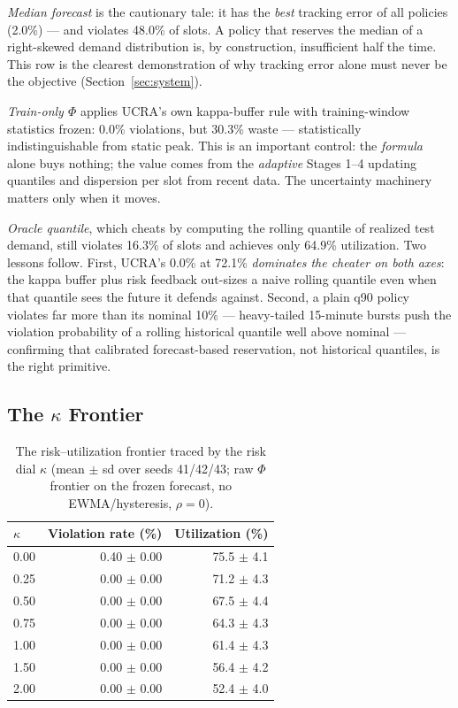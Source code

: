 \emph{Median forecast} is the cautionary tale: it has the \emph{best}
tracking error of all policies (2.0\%) --- and violates 48.0\% of
slots. A policy that reserves the median of a right-skewed demand
distribution is, by construction, insufficient half the time. This
row is the clearest demonstration of why tracking error alone must
never be the objective (Section~\ref{sec:system}).

\emph{Train-only $\Phi$} applies UCRA's own kappa-buffer rule with
training-window statistics frozen: 0.0\% violations, but 30.3\% waste
--- statistically indistinguishable from static peak. This is an
important control: the \emph{formula} alone buys nothing; the value
comes from the \emph{adaptive} Stages 1--4 updating quantiles and
dispersion per slot from recent data. The uncertainty machinery
matters only when it moves.

\emph{Oracle quantile}, which cheats by computing the rolling
quantile of realized test demand, still violates 16.3\% of slots and
achieves only 64.9\% utilization. Two lessons follow. First,
UCRA's 0.0\% at 72.1\% \emph{dominates the cheater on both axes}:
the kappa buffer plus risk feedback out-sizes a naive rolling
quantile even when that quantile sees the future it defends against.
Second, a plain q90 policy violates far more than its nominal 10\%
--- heavy-tailed 15-minute bursts push the violation probability of
a rolling historical quantile well above nominal --- confirming that
calibrated forecast-based reservation, not historical quantiles, is
the right primitive.

\subsection{The $\kappa$ Frontier}
\label{sec:results-kappa}

\begin{table}[!t]
\caption{The risk--utilization frontier traced by the risk dial
$\kappa$ (mean $\pm$ sd over seeds 41/42/43; raw $\Phi$ frontier on
the frozen forecast, no EWMA/hysteresis, $\rho = 0$).}
\label{tab:kappa}
\centering
\small
\begin{tabular}{@{}lrr@{}}
\toprule
$\kappa$ & Violation rate (\%) & Utilization (\%) \\
\midrule
0.00 & 0.40 $\pm$ 0.00 & 75.5 $\pm$ 4.1 \\
0.25 & 0.00 $\pm$ 0.00 & 71.2 $\pm$ 4.3 \\
0.50 & 0.00 $\pm$ 0.00 & 67.5 $\pm$ 4.4 \\
0.75 & 0.00 $\pm$ 0.00 & 64.3 $\pm$ 4.3 \\
1.00 & 0.00 $\pm$ 0.00 & 61.4 $\pm$ 4.3 \\
1.50 & 0.00 $\pm$ 0.00 & 56.4 $\pm$ 4.2 \\
2.00 & 0.00 $\pm$ 0.00 & 52.4 $\pm$ 4.0 \\
\bottomrule
\end{tabular}
\end{table}

